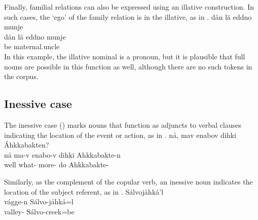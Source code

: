 Finally, familial relations can also be expressed using an illative construction. In such cases, the ‘ego’ of the family relation is in the illative, as in .
\ea\label{ill5}
\glll	dån lä eddno {munje} \\
	dån lä eddno munje\\
	 be\BS{} maternal.uncle\BS{}  \\%
\z
In this example, the illative nominal is a pronoun, but it is plausible that full nouns are possible in this function as well, although there are no such tokens in the corpus.


\subsection{Inessive case}\label{inessive}
The inessive case \mbox{(\INESSs)} marks nouns that function as adjuncts to verbal clauses indicating the location of the event or action, as in . 
\ea\label{iness1}
\glll	nå, mav enabov dihki {Áhkkabakten?} \\
	nå ma-v enabo-v dihki Ahkkabakte-n \\
	well what- more- do\BS{} Ahkkabakte- \\\nopagebreak
{} 
\z

Similarly, as the complement of the copular verb, an inessive noun indicates the location of the subject referent, as in .
\ea\label{iness2}
 Sálvojåhkå'l\\
	vágge-n Sálvo-jåhkå=l\\
	valley- Sálvo-creek\BS{}=be\BS{}\\\nopagebreak
{} 
\z

